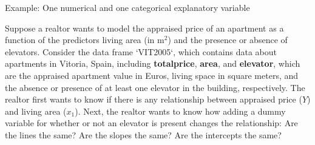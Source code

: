 \documentclass[
  ignorenonframetext,
]{beamer}
\begin{document}
\begin{frame}{Example: One numerical and one categorical explanatory
variable}
\protect\hypertarget{example-one-numerical-and-one-categorical-explanatory-variable}{}
\begin{tcolorbox}
Suppose a realtor wants to model the appraised price of an apartment as a function of the predictors living area (in $\text{m}^2$) and the presence or absence of elevators. Consider the data frame `VIT2005`, which contains data about apartments in Vitoria, Spain, including \textbf{totalprice}, \textbf{area}, and \textbf{elevator}, which are the appraised apartment value in Euros, living space in square meters, and the absence or presence of at least one elevator in the building, respectively. The realtor first wants to know if there is any relationship between appraised price ($Y$) and living area ($x_1$). Next, the realtor wants to know how adding a dummy variable for whether or not an elevator is present changes the relationship: Are the lines the same? Are the slopes the same? Are the intercepts the same?
\end{tcolorbox}
\end{frame}
\end{document}
